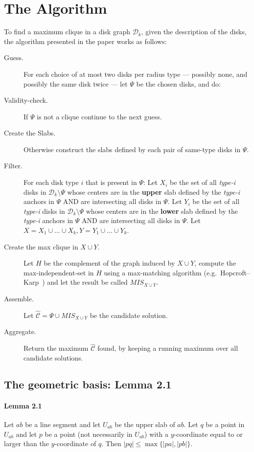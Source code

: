 \documentclass[12pt]{article}
\begin{document}
\section{The Algorithm}\label{sec:algo}
To find a maximum clique in a disk graph $\mathcal{D}_k$, given the description of the disks, the algorithm presented in the paper works as follows:
\begin{description}
  \item [Guess.] For each choice of at most two disks per radius type --- possibly none, and possibly the same disk twice --- let $\Psi$ be the chosen disks, and do:
  \item [Validity-check.] If $\Psi$ is not a clique continue to the next guess.
  \item [Create the Slabs.] Otherwise construct the slabs defined by each pair of same-type disks in $\Psi$.
  \item [Filter.] For each disk type $i$ that is present in $\Psi$:
  Let $X_i$ be the set of all \textit{type-i} disks in $\mathcal{D}_k \setminus \Psi$ whose centers are in the \textbf{upper} slab defined by the \textit{type-i} anchors in $\Psi$ AND are intersecting all disks in $\Psi$.
  Let $Y_i$ be the set of all \textit{type-i} disks in $\mathcal{D}_k \setminus \Psi$ whose centers are in the \textbf{lower} slab defined by the \textit{type-i} anchors in $\Psi$ AND are intersecting all disks in $\Psi$.
  Let $X = X_1 \cup \dots \cup X_k, Y = Y_1 \cup \dots \cup Y_k$.
  \item [Create the max clique in $X \cup Y$.] Let $H$ be the complement of the graph induced by $X \cup Y$,
  compute the max-independent-set in $H$ using a max-matching algorithm (e.g.\ Hopcroft--Karp~\cite{hopcroftkarp1973}) and let the result be called $MIS_{X \cup Y}$.
  \item [Assemble.] Let $\hat{\mathcal{C}} = \Psi \cup MIS_{X \cup Y}$ be the candidate solution.
  \item [Aggregate.] Return the maximum $\hat{\mathcal{C}}$ found, by keeping a running maximum over all candidate solutions. 
\end{description}
\subsection{The geometric basis: Lemma 2.1}
\paragraph{Lemma 2.1} Let $ab$ be a line segment and let $U_{ab}$ be the upper slab of $ab$.
Let $q$ be a point in $U_{ab}$ and let $p$ be a point (not necessarily in $U_{ab}$) with a $y$-coordinate equal to or larger than the $y$-coordinate of $q$.
Then $|pq| \leq \max\{|pa|, |pb|\}$.
\end{document}
